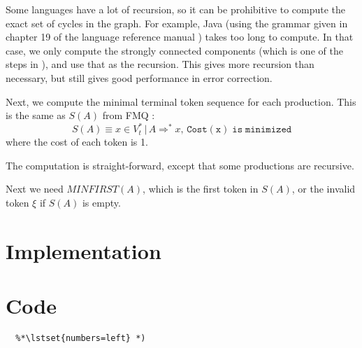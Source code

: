\documentclass{article}
\begin{document}
Some languages have a lot of recursion, so it can be prohibitive to
compute the exact set of cycles in the graph. For example, Java (using
the grammar given in chapter 19 of the language reference manual
\cite{javarm}) takes too long to compute. In that case, we only
compute the strongly connected components (which is one of the steps
in \cite{graph-cycles}), and use that as the recursion. This gives
more recursion than necessary, but still gives good performance in
error correction.

Next, we compute the minimal terminal token sequence for each production.
This is the same as $S(A)$ from FMQ \cite{FMQ 1980}:
\begin{equation}
S(A) \equiv x \in V_t^* \, |\, A \Rightarrow^* x, \, \mathtt{Cost(x)\; is\; minimized}
\end{equation}
where the cost of each token is 1.

The computation is straight-forward, except that some productions are
recursive.

Next we need $MINFIRST(A)$, which is the first token in $S(A)$, or the
invalid token $\xi$ if $S(A)$ is empty.


\section{Implementation}

\section{Code}
\label{code}
\begin{lstlisting}
  %*\lstset{numbers=left} *)

\end{lstlisting}
\end{document}
